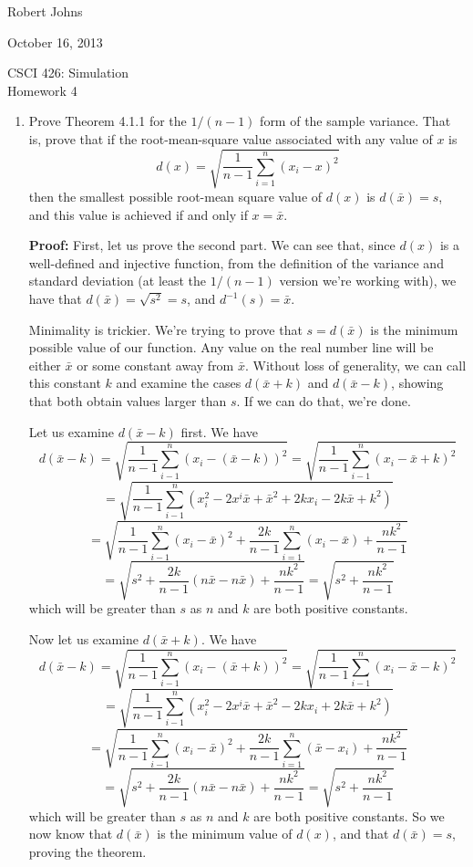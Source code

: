 \documentclass[11pt]{article} %
\newcommand{\inv}{^{-1}}
\begin{document}
\hfill Robert Johns

\hfill October 16, 2013

\begin{center} {\Large CSCI 426: Simulation}\\{\large Homework 4}\end{center}

\begin{enumerate}

\item[4.1.2] Prove Theorem 4.1.1 for the $1/(n-1)$ form of the sample variance.  That is, prove that if the root-mean-square value associated with any value of $x$ is $$d(x) = \sqrt{\frac{1}{n-1}\sum_{i=1}^n(x_i-x)^2}$$ then the smallest possible root-mean square value of $d(x)$ is $d(\bar{x}) = s$, and this value is achieved if and only if $x = \bar{x}$.

{\bf Proof:} First, let us prove the second part. We can see that, since $d(x)$ is a well-defined and injective function, from the definition of the variance and standard deviation (at least the $1/(n-1)$ version we're working with), we have that $d(\bar{x}) = \sqrt{s^2} = s$, and $d\inv(s) = \bar{x}$.  

Minimality is trickier.  We're trying to prove that $s = d(\bar{x})$ is the minimum possible value of our function.  Any value on the real number line will be either $\bar{x}$ or some constant away from $\bar{x}$.  Without loss of generality, we can call this constant $k$ and examine the cases $d(\bar{x} + k)$ and $d(\bar{x} - k)$, showing that both obtain values larger than $s$.  If we can do that, we're done.

Let us examine $d(\bar{x} - k)$ first.  We have
 $$d(\bar{x} - k) = \sqrt{\frac{1}{n-1}\sum_{i-1}^n(x_i - (\bar{x} - k))^2} = \sqrt{\frac{1}{n-1}\sum_{i-1}^n(x_i - \bar{x} + k)^2}$$ 
$$= \sqrt{\frac{1}{n-1}\sum_{i-1}^n(x_i^2 - 2x^i\bar{x} + \bar{x}^2 + 2kx_i -2k\bar{x} + k^2)}$$ 
$$= \sqrt{\frac{1}{n-1}\sum_{i-1}^n(x_i - \bar{x})^2 + \frac{2k}{n-1}\sum_{i=1}^n(x_i -\bar{x}) + \frac{nk^2}{n-1}}$$ 
$$ = \sqrt{s^2 + \frac{2k}{n-1}(n\bar{x} - n\bar{x}) + \frac{nk^2}{n-1}} = \sqrt{s^2 + \frac{nk^2}{n-1}}$$ which will be greater than $s$ as $n$ and $k$ are both positive constants.  

Now let us examine $d(\bar{x} + k)$.  We have 
$$d(\bar{x} - k) = \sqrt{\frac{1}{n-1}\sum_{i-1}^n(x_i - (\bar{x} + k))^2} = \sqrt{\frac{1}{n-1}\sum_{i-1}^n(x_i - \bar{x} - k)^2}$$ 
$$= \sqrt{\frac{1}{n-1}\sum_{i-1}^n(x_i^2 - 2x^i\bar{x} + \bar{x}^2 - 2kx_i  + 2k\bar{x} + k^2)}$$ 
$$= \sqrt{\frac{1}{n-1}\sum_{i-1}^n(x_i - \bar{x})^2 + \frac{2k}{n-1}\sum_{i=1}^n(\bar{x} - x_i) + \frac{nk^2}{n-1}}$$ 
$$ = \sqrt{s^2 + \frac{2k}{n-1}(n\bar{x} - n\bar{x}) + \frac{nk^2}{n-1}} = \sqrt{s^2 + \frac{nk^2}{n-1}}$$ which will be greater than $s$ as $n$ and $k$ are both positive constants.  So we now know that $d(\bar{x})$ is the minimum value of $d(x)$, and that $d(\bar{x}) = s$, proving the theorem. 


\end{enumerate}
\end{document}
